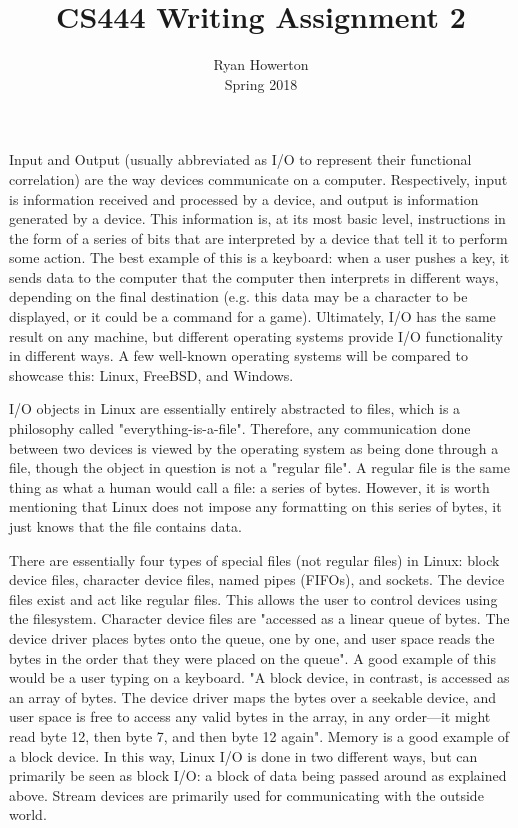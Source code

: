 \documentclass[10pt,draftclsnofoot,onecolumn]{IEEEtran}
\title{CS444 Writing Assignment 2}
\author{Ryan Howerton \\ Spring 2018}
\begin{document}
	\maketitle
    \newpage
    Input and Output (usually abbreviated as I/O to represent their functional correlation) are the way devices communicate on a computer. Respectively, input is information received and processed by a device, and output is information generated by a device. This information is, at its most basic level, instructions in the form of a series of bits that are interpreted by a device that tell it to perform some action. The best example of this is a keyboard: when a user pushes a key, it sends data to the computer that the computer then interprets in different ways, depending on the final destination (e.g. this data may be a character to be displayed, or it could be a command for a game). Ultimately, I/O has the same result on any machine, but different operating systems provide I/O functionality in different ways. A few well-known operating systems will be compared to showcase this: Linux, FreeBSD, and Windows.
    \par
    I/O objects in Linux are essentially entirely abstracted to files, which is a philosophy called "everything-is-a-file". Therefore, any communication done between two devices is viewed by the operating system as being done through a file, though the object in question is not a "regular file". A regular file is the same thing as what a human would call a file: a series of bytes. However, it is worth mentioning that Linux does not impose any formatting on this series of bytes, it just knows that the file contains data.\par
    There are essentially four types of special files (not regular files) in Linux: block device files, character device files, named pipes (FIFOs), and sockets. The device files exist and act like regular files. This allows the user to control devices using the filesystem. Character device files are "accessed as a linear queue of bytes. The device driver places bytes onto the queue, one by one, and user space reads the bytes in the order that they were placed on the queue"\cite{love_2014}. A good example of this would be a user typing on a keyboard. "A block device, in contrast, is accessed as an array of bytes. The device driver maps the bytes over a seekable device, and user space is free to access any valid bytes in the array, in any order—it might read byte 12, then byte 7, and then byte 12 again"\cite{love_2014}. Memory is a good example of a block device. In this way, Linux I/O is done in two different ways, but can primarily be seen as block I/O: a block of data being passed around as explained above. Stream devices are primarily used for communicating with the outside world.\newline
\end{document}
